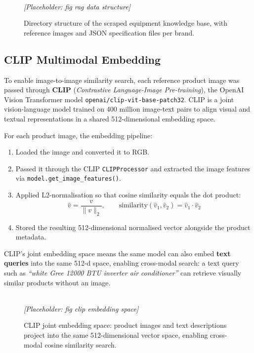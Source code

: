 \begin{figure}[htbp]
  \centering
  \framebox[\linewidth]{\rule{0pt}{4cm}}
  \\[4pt]
  {\small\textit{[Placeholder: fig rag data structure]}}  
  
  \caption{Directory structure of the scraped equipment knowledge base, with reference images and JSON specification files per brand.}
  \label{fig:ch4-rag-data}
\end{figure}

\subsection{CLIP Multimodal Embedding}

To enable image-to-image similarity search, each reference product image was passed through \textbf{CLIP} (\textit{Contrastive Language-Image Pre-training}), the OpenAI Vision Transformer model \texttt{openai/clip-vit-base-patch32}. CLIP is a joint vision-language model trained on 400 million image-text pairs to align visual and textual representations in a shared 512-dimensional embedding space.

For each product image, the embedding pipeline:
\begin{enumerate}
  \item Loaded the image and converted it to RGB.
  \item Passed it through the CLIP \texttt{CLIPProcessor} and extracted the image features via \texttt{model.get\_image\_features()}.
  \item Applied L2-normalisation so that cosine similarity equals the dot product:
  \begin{equation}
    \hat{v} = \frac{v}{\|v\|_2}, \qquad \text{similarity}(\hat{v}_1, \hat{v}_2) = \hat{v}_1 \cdot \hat{v}_2
  \end{equation}
  \item Stored the resulting 512-dimensional normalised vector alongside the product metadata.
\end{enumerate}

CLIP's joint embedding space means the same model can also embed \textbf{text queries} into the same 512-d space, enabling cross-modal search: a text query such as \textit{``white Gree 12000 BTU inverter air conditioner''} can retrieve visually similar products without an image.

\begin{figure}[htbp]
  \centering
  \framebox[\linewidth]{\rule{0pt}{4cm}}
  \\[4pt]
  {\small\textit{[Placeholder: fig clip embedding space]}}  
  
  \caption{CLIP joint embedding space: product images and text descriptions project into the same 512-dimensional vector space, enabling cross-modal cosine similarity search.}
  \label{fig:ch4-clip}
\end{figure}

